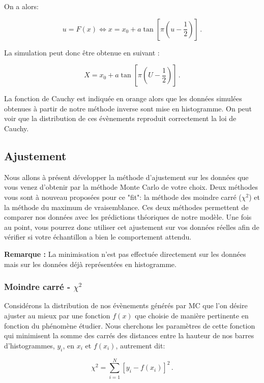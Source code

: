 On a alors:

\begin{equation}
u = F(x) \Longleftrightarrow x = x_{0} + a \tan \left[ \pi  \left(u - \frac{1}{2} \right)  \right] \, .
\end{equation}

La simulation peut donc être obtenue en suivant :

\begin{equation}
X = x_{0} + a \tan \left[ \pi  \left(U - \frac{1}{2} \right)  \right] \, .
\end{equation}

La fonction de Cauchy est indiquée en orange alors que les données simulées obtenues à partir de notre méthode inverse sont mise en histogramme. On peut voir que la distribution de ces évènements reproduit correctement la loi de Cauchy.

\subsection{Ajustement}
Nous allons à présent développer la méthode d'ajustement sur les données que vous venez d'obtenir par la méthode Monte Carlo de votre choix. Deux méthodes vous sont à nouveau proposées pour ce "fit": la méthode des moindre carré ($\chi^2$) et la méthode du maximum de vraisemblance. Ces deux méthodes permettent de comparer nos données avec les prédictions théoriques de notre modèle. Une fois au point, vous pourrez donc utiliser cet ajustement sur vos données réelles afin de vérifier si votre échantillon a bien le comportement attendu. 

\textbf{Remarque :} La minimisation n'est pas effectuée directement sur les données mais sur les données déjà représentées en histogramme.

\subsubsection{Moindre carré - $\chi^{2}$}
Considérons la distribution de nos évènements générés par MC  que l'on désire ajuster au mieux par une fonction $f(x)$ que choisie de manière pertinente en fonction du phénomène étudier. Nous cherchons les paramètres de cette fonction qui minimisent la somme des carrés des distances entre la hauteur de nos barres d'histogrammes, $y_i$, en $x_i$ et $f(x_i)$, autrement dit:

\begin{equation}
\chi^2 = \sum_{i=1}^{N} \left[ y_i - f(x_i) \right]^2 \, .
\end{equation}

